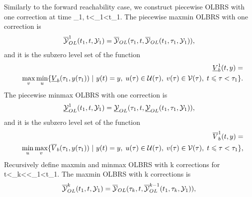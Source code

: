\documentclass[letterpaper,10pt,english]{sphinxmanual}
\begin{document}
Similarly to the forward reachability case, we construct piecewise OLBRS
with one correction at time \tau_1, t<\tau_1<t_1. The
piecewise maxmin OLBRS with one correction is
\begin{gather}
\begin{split}\overline{{\mathcal Y}}_{OL}^1(t_1, t, {\mathcal Y}_1) = \overline{{\mathcal Y}}_{OL}(\tau_1, t, \overline{{\mathcal Y}}_{OL}(t_1, \tau_1, {\mathcal Y}_1)),
\label{maxminb1}\end{split}\notag
\end{gather}
and it is the subzero level set of the function
\begin{gather}
\begin{split}\begin{aligned}
&&\underline{V}^1_b(t, y) = \nonumber \\
&&\max_v\min_u\{\underline{V}_b(\tau_1, y(\tau_1)) ~|~
y(t)=y, \; u(\tau)\in{\mathcal U}(\tau), \;
v(\tau)\in{\mathcal V}(\tau), \; t\leqslant\tau<\tau_1\}.
\label{maxminvfb1}\end{aligned}\end{split}\notag
\end{gather}
The piecewise minmax OLBRS with one correction is
\begin{gather}
\begin{split}\underline{{\mathcal Y}}_{OL}^1(t_1, t, {\mathcal Y}_1) = \underline{{\mathcal Y}}_{OL}(\tau_1, t, \underline{{\mathcal Y}}_{OL}(t_1, \tau_1, {\mathcal Y}_1)),
\label{minmaxb1}\end{split}\notag
\end{gather}
and it is the subzero level set of the function
\begin{gather}
\begin{split}\begin{aligned}
&&\overline{V}^1_b(t, y) = \nonumber \\
&&\min_u\max_v\{\overline{V}_b(\tau_1, y(\tau_1)) ~|~
y(t)=y, \; u(\tau)\in{\mathcal U}(\tau), \;
v(\tau)\in{\mathcal V}(\tau), \; t\leqslant\tau<\tau_1\},
\label{minmaxvfb1}\end{aligned}\end{split}\notag
\end{gather}
Recursively define maxmin and minmax OLBRS with k corrections
for t<\tau_k<\cdots<\tau_1<t_1. The maxmin OLBRS with k
corrections is
\begin{gather}
\begin{split}\overline{{\mathcal Y}}_{OL}^k(t_1, t, {\mathcal Y}_1) = \overline{{\mathcal Y}}_{OL}(\tau_k, t, \overline{{\mathcal Y}}_{OL}^{k-1}(t_1, \tau_k, {\mathcal Y}_1)),
\label{maxminbk}\end{split}\notag
\end{gather}
\end{document}
